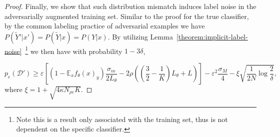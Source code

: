 \begin{proof}
Finally, we show that such distribution mismatch induces label noise in the adversarially augmented training set. Similar to the proof for the true classifier, by the common labeling practice of adversarial examples we have $P(\tilde{Y}'|x') = P(\tilde{Y}|x) = P(Y|x)$. 
By utilizing Lemma~\ref{theorem:implicit-label-noise}~\footnote{Note this is a result only associated with the training set, thus is not dependent on the specific classifier. } we then have with probability $1-3\delta$, 

\begin{equation}
    p_e(\mathcal{D}') \ge
    \varepsilon \left[(1 - \mathbb{E}_x f_\theta(x)_y) \frac{\sigma_m}{2L_\theta}- 2\rho\left(\left(\frac{3}{2} - \frac{1}{K}\right) L_\theta + L\right)\right]  - \varepsilon^2\frac{\sigma_M}{4}  
    - \xi \sqrt{\frac{1}{2N} \log\frac{2}{\delta}},
\end{equation}
where $\xi = 1 + \sqrt{4\kappa N_{\rho\varepsilon} K}$.
    

\end{proof}

